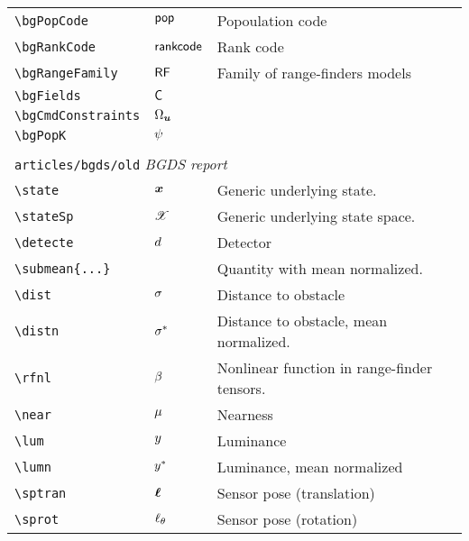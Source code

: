 \begin{longtable}{lll}
 {\color[rgb]{0.5,0.5,0.5}\texttt{\textbackslash bgPopCode}} & $\mathsf{pop}$ &  Popoulation code\\ 
 {\color[rgb]{0.5,0.5,0.5}\texttt{\textbackslash bgRankCode}} & $\mathsf{rankcode}$ &  Rank code\\ 
 {\color[rgb]{0.5,0.5,0.5}\texttt{\textbackslash bgRangeFamily}} & $\mathsf{RF}$ &  Family of range-finders models\\ 
 {\color[rgb]{0.5,0.5,0.5}\texttt{\textbackslash bgFields}} & ${\mathsf{C}}$ & \\ 
 {\color[rgb]{0.5,0.5,0.5}\texttt{\textbackslash bgCmdConstraints}} & ${\Omega}_{\boldsymbol{u}}$ & \\ 
 {\color[rgb]{0.5,0.5,0.5}\texttt{\textbackslash bgPopK}} & $\psi$ & \\ 
  &  & \\ 
 \multicolumn{3}{l}{{\color[rgb]{0.5,0.5,0.5}\texttt{articles/bgds/old}} \emph{BGDS report}}\\ 
 \hline
{\color[rgb]{0.5,0.5,0.5}\texttt{\textbackslash state}} & $\boldsymbol{x}$ &  Generic underlying state.\\ 
 {\color[rgb]{0.5,0.5,0.5}\texttt{\textbackslash stateSp}} & $\mathscr{X}$ &  Generic underlying state space.\\ 
 {\color[rgb]{0.5,0.5,0.5}\texttt{\textbackslash detecte}} & $d$ &  Detector\\ 
 {\color[rgb]{0.5,0.5,0.5}\texttt{\textbackslash submean\{...\}}} &  &  Quantity with mean normalized.\\ 
 {\color[rgb]{0.5,0.5,0.5}\texttt{\textbackslash dist}} & $\sigma$ &  Distance to obstacle\\ 
 {\color[rgb]{0.5,0.5,0.5}\texttt{\textbackslash distn}} & ${\sigma}^{*}$ &  Distance to obstacle, mean normalized.\\ 
 {\color[rgb]{0.5,0.5,0.5}\texttt{\textbackslash rfnl}} & $\beta$ &  Nonlinear function in range-finder tensors.\\ 
 {\color[rgb]{0.5,0.5,0.5}\texttt{\textbackslash near}} & $\mu$ &  Nearness\\ 
 {\color[rgb]{0.5,0.5,0.5}\texttt{\textbackslash lum}} & $y$ &  Luminance\\ 
 {\color[rgb]{0.5,0.5,0.5}\texttt{\textbackslash lumn}} & ${y}^{*}$ &  Luminance, mean normalized\\ 
 {\color[rgb]{0.5,0.5,0.5}\texttt{\textbackslash sptran}} & $\boldsymbol{\ell}$ &  Sensor pose (translation)\\ 
 {\color[rgb]{0.5,0.5,0.5}\texttt{\textbackslash sprot}} & $\ell_{\theta}$ &  Sensor pose (rotation)\\ 

\end{longtable}
